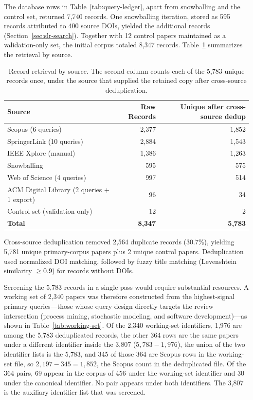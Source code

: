 The database rows in Table~\ref{tab:query-ledger}, apart from snowballing
and the control set, returned 7{,}740
records. One snowballing iteration, stored as 595 records attributed to
400 source DOIs, yielded the additional records
(Section~\ref{sec:slr-search}). Together with 12 control papers maintained as a
validation-only set, the initial corpus totaled 8{,}347 records.
Table~\ref{tab:retrieval} summarizes the retrieval by source.

\begin{table}[htbp]
\centering
\caption{Record retrieval by source. The second column counts each of the
5{,}783 unique records once, under the source that supplied the retained
copy after cross-source deduplication.}
\label{tab:retrieval}
\begin{tabular}{lrr}
\toprule
\textbf{Source} & \textbf{Raw Records} & \textbf{Unique after cross-source dedup} \\
\midrule
Scopus (6 queries)      & 2{,}377 & 1{,}852 \\
SpringerLink (10 queries) & 2{,}884 & 1{,}543 \\
IEEE Xplore (manual)    & 1{,}386 & 1{,}263 \\
Snowballing             &   595   &   575   \\
Web of Science (4 queries) & 997  &   514   \\
ACM Digital Library (2 queries + 1 export) & 96 &  34  \\
Control set (validation only) & 12 &    2   \\
\midrule
\textbf{Total} & \textbf{8{,}347} & \textbf{5{,}783} \\
\bottomrule
\end{tabular}
\end{table}

Cross-source deduplication removed 2{,}564 duplicate records (30.7\%),
yielding 5{,}781 unique primary-corpus papers plus 2 unique control papers.
Deduplication used normalized DOI matching, followed by fuzzy title matching
(Levenshtein similarity $\geq 0.9$) for records without DOIs.

Screening the 5{,}783 records in a single pass would require substantial
resources. A working set of 2{,}340 papers was therefore constructed from
the highest-signal primary queries---those whose query design directly
targets the review intersection (process mining, stochastic modeling,
and software development)---as shown in Table~\ref{tab:working-set}.
Of the 2{,}340 working-set identifiers, 1{,}976 are among the 5{,}783
deduplicated records, the other 364 rows are the same papers under a
different identifier inside the 3{,}807 ($5{,}783 - 1{,}976$), the union
of the two identifier lists is the 5{,}783, and 345 of those 364 are
Scopus rows in the working-set file, so $2{,}197 - 345 = 1{,}852$, the
Scopus count in the deduplicated file.
Of the 364 pairs, 69 appear in the corpus of 456 under the working-set
identifier and 30 under the canonical identifier. No pair appears under
both identifiers. The 3{,}807 is the auxiliary identifier list that was screened.

